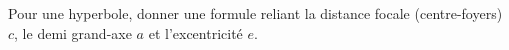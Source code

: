  Pour une hyperbole, donner une formule reliant la distance focale (centre-foyers) $c$, le demi grand-axe $a$ et l'excentricit\'e $e$. \bigskip